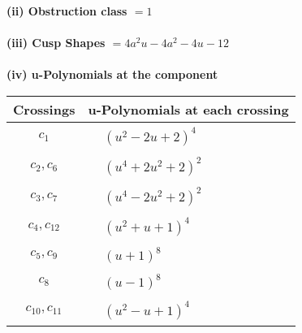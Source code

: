 \documentclass[1p]{elsarticle_modified}
\theoremstyle{definition}
\begin{document}
\flushleft \textbf{(ii) Obstruction class $= 1$}\\~\\
\flushleft \textbf{(iii) Cusp Shapes $= 4 a^2 u-4 a^2-4 u-12$}\\~\\
\newpage\renewcommand{\arraystretch}{1}
\flushleft \textbf{(iv) u-Polynomials at the component}\newline \\
\begin{tabular}{m{50pt}|m{274pt}}
Crossings & \hspace{64pt}u-Polynomials at each crossing \\
\hline $$\begin{aligned}c_{1}\end{aligned}$$&$\begin{aligned}
&(u^2-2 u+2)^4
\end{aligned}$\\
\hline $$\begin{aligned}c_{2},c_{6}\end{aligned}$$&$\begin{aligned}
&(u^4+2 u^2+2)^2
\end{aligned}$\\
\hline $$\begin{aligned}c_{3},c_{7}\end{aligned}$$&$\begin{aligned}
&(u^4-2 u^2+2)^2
\end{aligned}$\\
\hline $$\begin{aligned}c_{4},c_{12}\end{aligned}$$&$\begin{aligned}
&(u^2+u+1)^4
\end{aligned}$\\
\hline $$\begin{aligned}c_{5},c_{9}\end{aligned}$$&$\begin{aligned}
&(u+1)^8
\end{aligned}$\\
\hline $$\begin{aligned}c_{8}\end{aligned}$$&$\begin{aligned}
&(u-1)^8
\end{aligned}$\\
\hline $$\begin{aligned}c_{10},c_{11}\end{aligned}$$&$\begin{aligned}
&(u^2- u+1)^4
\end{aligned}$\\
\hline
\end{tabular}\\~\\
\end{document}
